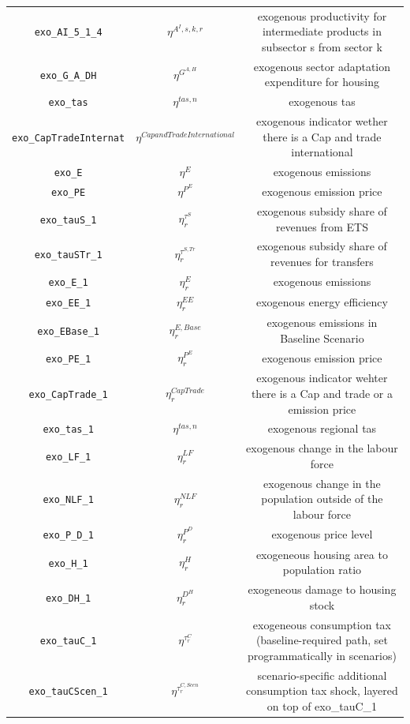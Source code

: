 \begin{center}
\begin{longtable}{ccc}
\texttt{exo\_AI\_5\_1\_4} & ${\eta^{A^{I},s,k,r}}$ & exogenous productivity for intermediate products in subsector s from sector k\\
\texttt{exo\_G\_A\_DH} & ${\eta^{G^{A,H}}}$ & exogenous sector adaptation expenditure for housing\\
\texttt{exo\_tas} & ${\eta^{tas,n}}$ & exogenous tas\\
\texttt{exo\_CapTradeInternat} & ${\eta^{Cap and Trade International}}$ & exogenous indicator wether there is a Cap and trade international\\
\texttt{exo\_E} & ${\eta^{E}}$ & exogenous emissions\\
\texttt{exo\_PE} & ${\eta^{P^E}}$ & exogenous emission price\\
\texttt{exo\_tauS\_1} & ${\eta^{\tau^{S}}_r}$ & exogenous subsidy share of revenues from ETS\\
\texttt{exo\_tauSTr\_1} & ${\eta^{\tau^{S,Tr}}_r}$ & exogenous subsidy share of revenues for transfers\\
\texttt{exo\_E\_1} & ${\eta^{E}_r}$ & exogenous emissions\\
\texttt{exo\_EE\_1} & ${\eta^{EE}_r}$ & exogenous energy efficiency\\
\texttt{exo\_EBase\_1} & ${\eta^{E,Base}_r}$ & exogenous emissions in Baseline Scenario\\
\texttt{exo\_PE\_1} & ${\eta^{P^E}_r}$ & exogenous emission price\\
\texttt{exo\_CapTrade\_1} & ${\eta^{CapTrade}_r}$ & exogenous indicator wehter there is a Cap and trade or a emission price\\
\texttt{exo\_tas\_1} & ${\eta^{tas,n}}$ & exogenous regional tas\\
\texttt{exo\_LF\_1} & ${\eta^{LF}_{r}}$ & exogenous change in the labour force\\
\texttt{exo\_NLF\_1} & ${\eta^{NLF}_{r}}$ & exogenous change in the population outside of the labour force\\
\texttt{exo\_P\_D\_1} & ${\eta^{P^D}_{r}}$ & exogenous price level\\
\texttt{exo\_H\_1} & ${\eta^{H}_r}$ & exogeneous housing area to population ratio\\
\texttt{exo\_DH\_1} & ${\eta^{D^{H}}_r}$ & exogeneous damage to housing stock\\
\texttt{exo\_tauC\_1} & ${\eta^{\tau^C_{r}}}$ & exogeneous consumption tax (baseline-required path, set programmatically in scenarios)\\
\texttt{exo\_tauCScen\_1} & ${\eta^{\tau^{C,Scen}_{r}}}$ & scenario-specific additional consumption tax shock, layered on top of exo\_tauC\_1\\

\end{longtable}
\end{center}
